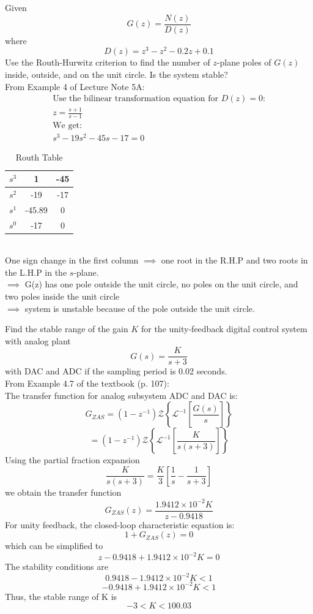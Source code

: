 \documentclass[12pt]{article}
\newenvironment{problem}[2][Problem]{\begin{trivlist}
\item[\hskip \labelsep {\bfseries #1}\hskip \labelsep {\bfseries #2.}]}{\end{trivlist}}
\begin{document}
\pagebreak
\begin{problem}{4}
    Given
    $$G(z) = \frac{N(z)}{D(z)}$$
    where
    $$D(z) = z^3-z^2-0.2z+0.1$$
    Use the Routh-Hurwitz criterion to find the number of $z$-plane poles of $G(z)$ inside, outside, and on the unit circle. Is the system stable?\\
    From Example 4 of Lecture Note 5A:
    \begin{align*}
        \text{Use the bilinear transformation equation for $D(z)=0$:}\\
        z=\frac{s+1}{s-1}\\
        \text{We get:}\\
        s^3-19s^2-45s-17=0
    \end{align*}
    \begin{table}[h]
        \caption{Routh Table}
        \begin{center}
        \begin{tabular}{|c|c|c|}
        \hline
        \textbf{$s^3$} & 1 & -45 \\
        \hline
        \textbf{$s^2$} & -19 & -17 \\
        \hline
        \textbf{$s^1$} & -45.89 & 0 \\
        \hline
        \textbf{$s^0$} & -17 & 0 \\
        \hline
        \end{tabular}
        \end{center}
      \end{table}
      \\
      One sign change in the first column $\implies$ one root in the R.H.P and two roots in the L.H.P in the $s$-plane.\\
      $\implies$ G(z) has one pole outside the unit circle, no poles on the unit circle, and two poles inside the unit circle\\
      $\implies$ system is unstable because of the pole outside the unit circle.
\end{problem}
\pagebreak
\begin{problem}{5}
    Find the stable range of the gain $K$ for the unity-feedback digital control system with analog plant
    $$G(s) = \frac{K}{s+3}$$
    with DAC and ADC if the sampling period is 0.02 seconds.\\
    From Example 4.7 of the textbook (p. 107):\\
    The transfer function for analog subsystem ADC and DAC is:
    $$G_{ZAS}=(1-z^{-1})\mathcal{Z}\left\{\mathcal{L}^{-1}\left[\frac{G(s)}{s}\right]\right\}$$
    $$=(1-z^{-1})\mathcal{Z}\left\{\mathcal{L}^{-1}\left[\frac{K}{s(s+3)}\right]\right\}$$
    Using the partial fraction expansion
    $$\frac{K}{s(s+3)} = \frac{K}{3}\left[\frac{1}{s}-\frac{1}{s+3}\right]$$
    we obtain the transfer function
    $$G_{ZAS}(z) = \frac{1.9412\times10^{-2}K}{z-0.9418}$$
    For unity feedback, the closed-loop characteristic equation is:
    $$1+G_{ZAS}(z)=0$$
    which can be simplified to
    $$z-0.9418+1.9412\times10^{-2}K=0$$
    The stability conditions are
    $$0.9418-1.9412\times10^{-2}K<1$$
    $$-0.9418+1.9412\times10^{-2}K<1$$
    Thus, the stable range of K is
    $$-3 < K < 100.03$$
\end{problem}
 
\end{document}
